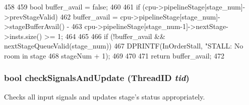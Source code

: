 \begin{DoxyCode}
458 {
459     bool buffer_avail = false;
460 
461     if (cpu->pipelineStage[stage_num]->prevStageValid) {
462         buffer_avail = cpu->pipelineStage[stage_num]->stageBufferAvail() -
463             cpu->pipelineStage[stage_num-1]->nextStage->insts.size() >= 1;
464     }
465 
466     if (!buffer_avail && nextStageQueueValid(stage_num)) {
467         DPRINTF(InOrderStall, "STALL: No room in stage %
468                 stageNum + 1);
469     }
470 
471     return buffer_avail;
472 }
\end{DoxyCode}
\hypertarget{classPipelineStage_af77f2bf38a75182c65e633b9fdf295d2}{
\subsubsection[{checkSignalsAndUpdate}]{\setlength{\rightskip}{0pt plus 5cm}bool checkSignalsAndUpdate ({\bf ThreadID} {\em tid})}}
\label{classPipelineStage_af77f2bf38a75182c65e633b9fdf295d2}
Checks all input signals and updates stage's status appropriately. 


